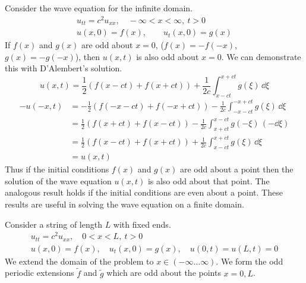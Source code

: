 Consider the wave equation for the infinite domain.
\begin{gather*}
  u_{t t} = c^2 u_{x x}, \quad -\infty <  x < \infty, \ t > 0 
  \\
  u(x,0) = f(x), \qquad u_t(x,0) = g(x)
\end{gather*}
If $f(x)$ and $g(x)$ are odd about $x = 0$, ($f(x) = - f(-x)$,
$g(x) = - g(-x)$), then $u(x,t)$ is also odd about $x = 0$.  We can 
demonstrate this with D'Alembert's solution.
\[
u(x,t) = \frac{1}{2} \left( f(x - c t) + f(x + c t) \right)
+ \frac{1}{2c} \int_{x - c t}^{x + c t} g(\xi) \,\dd \xi
\]
\begin{align*}
  - u(-x,t)
  &= - \frac{1}{2} \left( f(- x - c t) + f(- x + c t) \right)
  - \frac{1}{2c} \int_{-x - c t}^{-x + c t} g(\xi) \,\dd \xi
  \\
  &= \frac{1}{2} \left( f(x + c t) + f(x - c t) \right)
  - \frac{1}{2c} \int_{x + c t}^{x - c t} g(-\xi) \,(-\dd \xi)
  \\
  &= \frac{1}{2} \left( f(x - c t) + f(x + c t) \right)
  + \frac{1}{2c} \int_{x - c t}^{x + c t} g(\xi) \,\dd \xi
  \\
  &= u(x,t)
\end{align*}
Thus if the initial conditions $f(x)$ and $g(x)$ are odd about a 
point then the solution of the wave equation $u(x,t)$ is also odd about 
that point.  The analogous result holds if the initial conditions are even
about a point.  These results are useful in solving the wave equation on
a finite domain.





Consider a string of length $L$ with fixed ends.
\begin{gather*}
  u_{t t} = c^2 u_{x x}, \quad 0 < x < L, \ t > 0 
  \\
  u(x,0) = f(x), \quad u_t(x,0) = g(x), \quad
  u(0,t) = u(L,t) = 0
\end{gather*}
We extend the domain of the problem to $x \in (-\infty \ldots \infty)$.  We form the odd
periodic extensions $\tilde{f}$ and $\tilde{g}$ which are odd about the 
points $x = 0,L$.  

